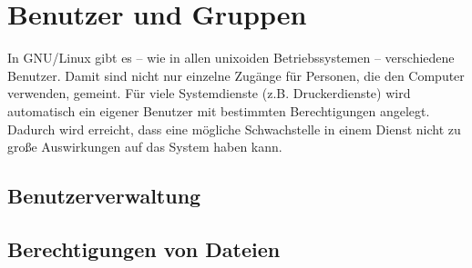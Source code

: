 \section {Benutzer und Gruppen}

In GNU/Linux gibt es -- wie in allen unixoiden Betriebssystemen -- verschiedene Benutzer. Damit sind nicht nur einzelne Zugänge für Personen, die den Computer verwenden, gemeint. Für viele Systemdienste (z.B. Druckerdienste) wird automatisch ein eigener Benutzer mit bestimmten Berechtigungen angelegt. Dadurch wird erreicht, dass eine mögliche Schwachstelle in einem Dienst nicht zu große Auswirkungen auf das System haben kann.

\subsection {Benutzerverwaltung}

\subsection {Berechtigungen von Dateien}
